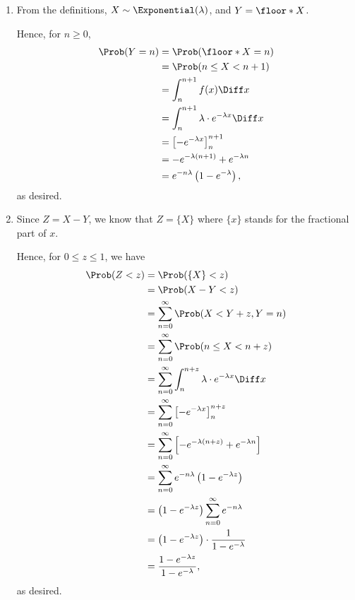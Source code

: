 \Question{\currfilebase}

\begin{enumerate}
    \item From the definitions, \(X \sim \Exponential(\lambda)\), and \(Y = \floor*{X}\).

          Hence, for \(n \geq 0\),
          \begin{align*}
              \Prob(Y = n) & = \Prob(\floor*{X} = n)                                 \\
                           & = \Prob(n \leq X < n + 1)                               \\
                           & = \int_{n}^{n + 1} f(x) \Diff x                         \\
                           & = \int_{n}^{n + 1} \lambda \cdot e^{-\lambda x} \Diff x \\
                           & = \left[- e^{-\lambda x}\right]_{n}^{n + 1}             \\
                           & = - e^{-\lambda (n + 1)} + e^{-\lambda n}               \\
                           & = e^{-n\lambda} \left(1 - e^{-\lambda} \right),
          \end{align*}
          as desired.

    \item Since \(Z = X - Y\), we know that \(Z = \{X\}\) where \(\{x\}\) stands for the fractional part of \(x\).

          Hence, for \(0 \leq z \leq 1\), we have
          \begin{align*}
              \Prob(Z < z) & = \Prob(\{X\} < z)                                                            \\
                           & = \Prob(X - Y < z)                                                            \\
                           & = \sum_{n = 0}^{\infty} \Prob(X < Y + z, Y = n)                               \\
                           & = \sum_{n = 0}^{\infty} \Prob(n \leq X < n + z)                               \\
                           & = \sum_{n = 0}^{\infty} \int_{n}^{n + z} \lambda \cdot e^{-\lambda x} \Diff x \\
                           & = \sum_{n = 0}^{\infty} \left[- e^{-\lambda x}\right]_{n}^{n + z}             \\
                           & = \sum_{n = 0}^{\infty} \left[- e^{-\lambda (n + z)} + e^{-\lambda n}\right]  \\
                           & = \sum_{n = 0}^{\infty} e^{-n\lambda} \left(1 - e^{-\lambda z} \right)        \\
                           & = \left(1 - e^{-\lambda z} \right) \sum_{n = 0}^{\infty} e^{-n\lambda}        \\
                           & = \left(1 - e^{-\lambda z} \right) \cdot \frac{1}{1 - e^{-\lambda}}           \\
                           & = \frac{1 - e^{-\lambda z}}{1 - e^{-\lambda}},
          \end{align*}
          as desired.


\end{enumerate}
